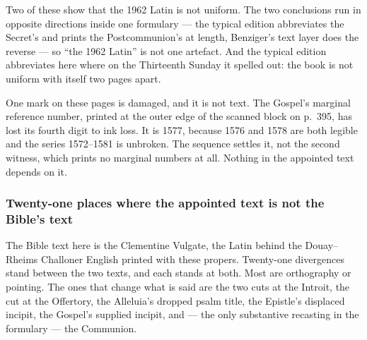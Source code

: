 Two of these show that the 1962 Latin is not uniform. The two conclusions run
in opposite directions inside one formulary --- the typical edition abbreviates
the Secret's and prints the Postcommunion's at length, Benziger's text layer
does the reverse --- so ``the 1962 Latin'' is not one artefact. And the typical edition abbreviates 
here where on the Thirteenth Sunday it spelled 
out: the book is not uniform with itself two pages apart.

One mark on these pages is damaged, and it is not text. The Gospel's marginal
reference number, printed at the outer edge of the scanned block on p.~395, has
lost its fourth digit to ink loss. It is 1577, because 1576 and 1578 are both
legible and the series 1572--1581 is unbroken. The sequence settles it, not the
second witness, which prints no marginal numbers at all. Nothing in
the appointed text depends on it.

\subsubsection*{Twenty-one places where the appointed text is not the Bible's text}

The Bible text here is the Clementine Vulgate, the Latin behind the
Douay--Rheims Challoner English printed with these propers. Twenty-one divergences stand between the two texts,
and each stands at both. Most are orthography or pointing. The ones that
change what is said are the two cuts at the Introit, the cut at the Offertory,
the Alleluia's dropped psalm title, the Epistle's displaced incipit, the
Gospel's supplied incipit, and ---
the only substantive recasting in the formulary --- the Communion.

